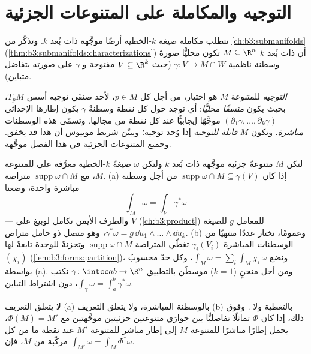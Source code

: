 \section{التوجيه والمكاملة على المتنوعات الجزئية}

تتطلب مكاملة صيغة $k$-الخطية أرضًا موجَّهة ذات بُعد $k$. وتذكّر
من \cref{ch:b3:submanifolds} (\cref{thm:b3:submanifolds:characterizations}) أن  ذات بُعد $k$ $M \subseteq \R^n$
تكون محليًّا صورةَ وسطنة ناظمية $\gamma\colon V \to M \cap W$ (حيث $V
\subseteq \R^k$ مفتوحة
و $\gamma$  على صورته بتفاضل متباين).

\begin{definition}\label{def:b3:forms:orientation}
\emph{التوجيه} للمتنوعة $M$ هو اختيار، من أجل كل
$p \in M$، لأحد صنفَي توجيه أسس  $T_pM$، بحيث
يكون \emph{متسقًا محليًّا}: أي توجد حول كل نقطة وسطنةٌ $\gamma$
يكون إطارها الإحداثي $(\partial_1\gamma, \dots,
\partial_k\gamma)$ موجَّهًا إيجابيًّا عند كل نقطة من
مجالها. وتسمّى هذه الوسطنات \emph{مباشرة}. وتكون $M$
\emph{قابلة للتوجيه} إذا وُجد توجيه؛ ويبيّن شريط موبيوس أن هذا
قد يخفق. وجميع المتنوعات الجزئية في هذا الفصل موجَّهة.
\end{definition}

\begin{definition}\label{def:b3:forms:integral}
لتكن $M$ متنوعةً جزئية موجَّهة ذات بُعد $k$ ولتكن $\omega$ صيغةً
$k$-الخطية معرَّفة على  للمتنوعة $M$، مع $\operatorname{supp}\omega \cap M$ متراصة.
(a) إذا كان $\operatorname{supp}\omega \cap M \subseteq
\gamma(V)$ من أجل وسطنة مباشرة واحدة، وضعنا
\[
\int_M\omega = \int_V\gamma^*\omega
\]
--- والطرف الأيمن تكامل لوبيغ على $V$ (\cref{ch:b3:product}) للمعامل $g$
للصيغة $\gamma^*\omega = g\,\dd u_1\wedge\dots\wedge\dd u_k$، وهو متصل ذو حامل متراص.
(b) وعمومًا، نختار عددًا منتهيًا من الوسطنات المباشرة
$\gamma_i(V_i)$ تغطّي المتراصة $\operatorname{supp}\omega \cap M$ وتجزئةً للوحدة تابعةً لها
$(\chi_i)$ (\cref{lem:b3:forms:partition})، ونضع $\int_M\omega =
\sum_i\int_M\chi_i\,\omega$، وكل حدّ محسوبٌ بواسطة
(a). ومن أجل منحنٍ ($k = 1$) موسطَن بالتطبيق $\gamma\colon\intcc ab\to\R^n$ نكتب
$\int_\gamma\omega = \int_a^b\gamma^*\omega$، دون اشتراط التباين.
\end{definition}

\begin{lemma}[الاتساق]\label{lem:b3:forms:consistency}
لا يتعلق التعريف (a) بالوسطنة المباشرة، ولا يتعلق التعريف (b)
بالتغطية ولا . وفوق ذلك، إذا كان $\Phi$ تماثلًا
تفاضليًّا بين جوارَي متنوعتين جزئيتين موجَّهتين مع
$\Phi(M) = M'$، يحمل إطارًا مباشرًا للمتنوعة $M$ إلى إطار مباشر
للمتنوعة $M'$ عند نقطة ما من كل مركّبة من $M$، فإن $\int_{M'}\omega =
\int_M\Phi^*\omega$.
\end{lemma}

